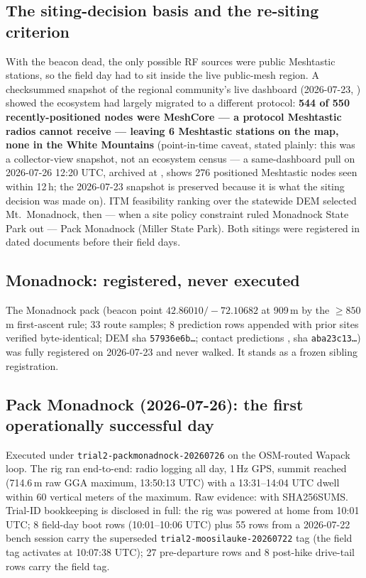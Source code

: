 \documentclass[11pt]{article}
\newcommand{\code}[1]{\texttt{\small #1}}
\begin{document}
\subsection{The siting-decision basis and the re-siting criterion}

With the beacon dead, the only possible RF sources were public Meshtastic
stations, so the field day had to sit inside the live public-mesh region. A
checksummed snapshot of the regional community's live dashboard (2026-07-23,
) showed the ecosystem
had largely migrated to a different protocol: \textbf{544 of 550
recently-positioned nodes were MeshCore --- a protocol Meshtastic radios
cannot receive --- leaving 6 Meshtastic stations on the map, none in the
White Mountains} (point-in-time caveat, stated plainly: this was a collector-view snapshot, not an ecosystem census --- a same-dashboard pull on 2026-07-26 12:20 UTC, archived at , shows 276 positioned Meshtastic nodes seen within 12\,h; the 2026-07-23 snapshot is preserved because it is what the siting decision was made on). ITM feasibility ranking over the statewide DEM
selected Mt.~Monadnock, then --- when a site policy constraint ruled
Monadnock State Park out --- Pack Monadnock (Miller State Park). Both
sitings were registered in dated documents before their field days.

\subsection{Monadnock: registered, never executed}

The Monadnock pack (beacon point $42.86010/-72.10682$ at 909\,m by the
${\geq}850$\,m first-ascent rule; 33 route samples; 8 prediction rows
appended with prior sites verified byte-identical; DEM sha
\code{57936e6b\ldots}; contact predictions
, sha
\code{aba23c13\ldots}) was fully registered on 2026-07-23 and never walked.
It stands as a frozen sibling registration.

\subsection{Pack Monadnock (2026-07-26): the first operationally successful day}\label{sec:packday}

Executed under \code{trial2-packmonadnock-20260726} on the OSM-routed Wapack
loop. The rig ran end-to-end: radio logging all day, 1\,Hz GPS, summit reached (714.6\,m raw GGA maximum, 13:50:13 UTC) with a 13:31--14:04 UTC dwell
within 60 vertical meters of the maximum. Raw evidence:
 with SHA256SUMS. Trial-ID bookkeeping is disclosed in full: the rig was powered at home from 10:01 UTC; 8 field-day boot rows (10:01--10:06 UTC) plus 55 rows from a 2026-07-22 bench session carry the superseded \code{trial2-moosilauke-20260722} tag (the field tag activates at 10:07:38 UTC); 27 pre-departure rows and 8 post-hike drive-tail rows carry the field tag.
\end{document}
